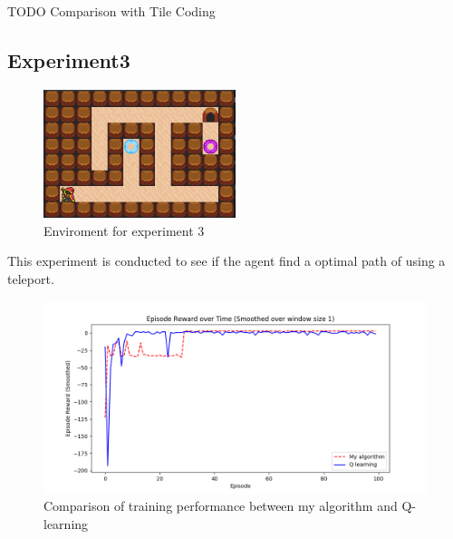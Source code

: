 TODO Comparison with Tile Coding
\newpage
\subsection{Experiment3}

\begin{figure}[!htb]
\centering
\includegraphics[width=0.5\textwidth]{./figures/experiment3_v2}
\caption{Enviroment for experiment 3}
\label{experiment3}
\end{figure}

This experiment is conducted to see if the agent find a optimal path of using a teleport. 

\begin{figure}[!htb]
\centering
\includegraphics[width=1.0\textwidth]{./figures/experiment3_training}
\caption{Comparison of training performance between my algorithm and Q-learning}
\label{experiment3_training}
\end{figure}

